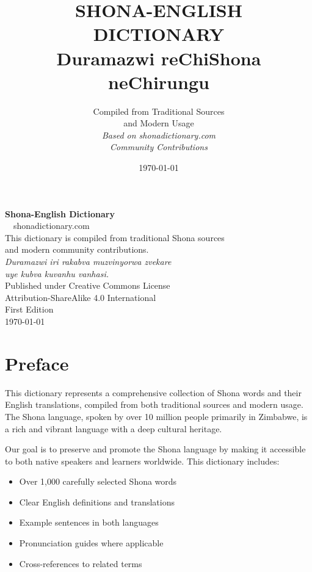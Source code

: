 \documentclass[10pt,twoside]{book}
\title{%
    {\Huge\textbf{SHONA-ENGLISH}}\\[0.5cm]
    {\Large\textbf{DICTIONARY}}\\[1cm]
    {\large Duramazwi reChiShona neChirungu}
}
\author{%
    Compiled from Traditional Sources\\
    and Modern Usage\\[0.5cm]
    \textit{Based on shonadictionary.com}\\
    \textit{Community Contributions}
}
\date{\today}
\begin{document}
\frontmatter
\maketitle

\newpage
\thispagestyle{empty}
\vspace*{\fill}
\begin{center}
\textbf{Shona-English Dictionary}\\[0.5cm]
\textcopyright\ \the\year\ shonadictionary.com\\[0.5cm]

This dictionary is compiled from traditional Shona sources\\
and modern community contributions.\\[1cm]

\textit{Duramazwi iri rakabva muzvinyorwa zvekare}\\
\textit{uye kubva kuvanhu vanhasi.}\\[1cm]

Published under Creative Commons License\\
Attribution-ShareAlike 4.0 International\\[0.5cm]

First Edition\\
\today
\end{center}
\vspace*{\fill}

\tableofcontents

\chapter*{Preface}

This dictionary represents a comprehensive collection of Shona words and their English translations, compiled from both traditional sources and modern usage. The Shona language, spoken by over 10 million people primarily in Zimbabwe, is a rich and vibrant language with a deep cultural heritage.

Our goal is to preserve and promote the Shona language by making it accessible to both native speakers and learners worldwide. This dictionary includes:

\begin{itemize}
\item Over 1,000 carefully selected Shona words
\item Clear English definitions and translations
\item Example sentences in both languages
\item Pronunciation guides where applicable
\item Cross-references to related terms
\end{itemize}
\end{document}
